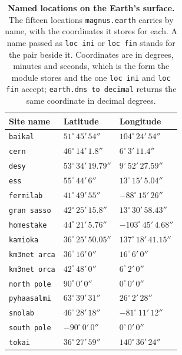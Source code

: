\documentclass[final,5p,times,twocolumn,sort,compress]{elsarticle}
\makeatletter
\DeclareRobustCommand{\_}{%
  \ifmmode\nfss@text{\textunderscore}\else\textunderscore\allowbreak\fi}
\makeatother
\begin{document}
\begin{table}[b!]
{\normalsize
\begin{tabular}{@{}p{2.6cm}p{2.5cm}p{2.7cm}@{}}
 Site name & Latitude & Longitude \\
 \hline
 {\tt baikal} & $51^\circ\,45'\,54''$ & $104^\circ\,24'\,54''$ \\
 {\tt cern} & $46^\circ\,14'\,1.8''$ & $6^\circ\,3'\,11.4''$ \\
 {\tt desy} & $53^\circ\,34'\,19.79''$ & $9^\circ\,52'\,27.59''$ \\
 {\tt ess} & $55^\circ\,44'\,6''$ & $13^\circ\,15'\,5.04''$ \\
 {\tt fermilab} & $41^\circ\,49'\,55''$ & $-88^\circ\,15'\,26''$ \\
 {\tt gran\_sasso} & $42^\circ\,25'\,15.8''$ & $13^\circ\,30'\,58.43''$ \\
 {\tt homestake} & $44^\circ\,21'\,5.76''$ & $-103^\circ\,45'\,4.68''$ \\
 {\tt kamioka} & $36^\circ\,25'\,50.05''$ & $137^\circ\,18'\,41.15''$ \\
 {\tt km3net\_arca} & $36^\circ\,16'\,0''$ & $16^\circ\,6'\,0''$ \\
 {\tt km3net\_orca} & $42^\circ\,48'\,0''$ & $6^\circ\,2'\,0''$ \\
 {\tt north\_pole} & $90^\circ\,0'\,0''$ & $0^\circ\,0'\,0''$ \\
 {\tt pyhaasalmi} & $63^\circ\,39'\,31''$ & $26^\circ\,2'\,28''$ \\
 {\tt snolab} & $46^\circ\,28'\,18''$ & $-81^\circ\,11'\,12''$ \\
 {\tt south\_pole} & $-90^\circ\,0'\,0''$ & $0^\circ\,0'\,0''$ \\
 {\tt tokai} & $36^\circ\,27'\,59''$ & $140^\circ\,36'\,24''$ \\
\end{tabular}
}
\caption{\label{tab:sites}\textbf{Named locations on the Earth\textquoteright s surface.} The fifteen locations {\tt magnus.earth} carries by name, with the coordinates it stores for each. A name passed as {\tt loc\_ini} or {\tt loc\_fin} stands for the pair beside it. Coordinates are in degrees, minutes and seconds, which is the form the module stores and the one {\tt loc\_ini} and {\tt loc\_fin} accept; {\tt earth.dms\_to\_decimal} returns the same coordinate in decimal degrees.}
\end{table}
\end{document}
